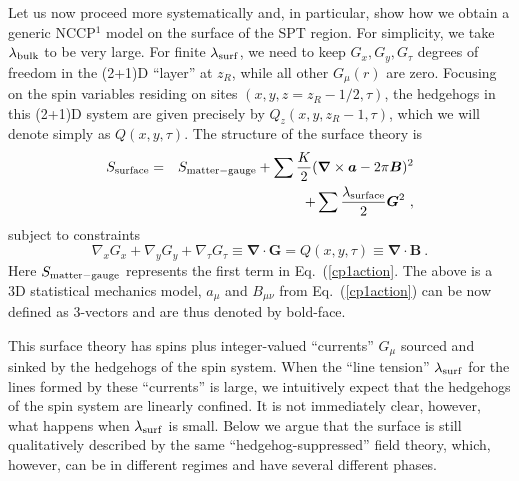\documentclass[prb,twocolumn]{revtex4-1}
\begin{document}
Let us now proceed more systematically and, in particular, show how we obtain a generic NCCP$^1$ model on the surface of the SPT region.  For simplicity, we take $\lambda_{\rm bulk}$ to be very large. For finite $\lambda_{\rm surf}$, we need to keep $G_x, G_y, G_\tau$ degrees of freedom in the (2+1)D ``layer'' at $z_R$, while all other $G_\mu(r)$ are zero.  Focusing on the spin variables residing on sites $(x, y, z=z_R-1/2, \tau)$, the hedgehogs in this (2+1)D system are given precisely by $Q_z(x, y, z_R-1, \tau)$, which we will denote simply as $Q(x, y, \tau)$.  The structure of the surface theory is
\begin{eqnarray*}
S_{\rm surface} &=& S_{\rm matter-gauge} + \sum \frac{K}{2} ({\bm\nabla} \times {\bm a} - 2\pi {\bm B})^2 \\
&& + \sum \frac{\lambda_{\rm surface}}{2} {\bm G}^2 ~,
\end{eqnarray*}
subject to constraints
\begin{equation}
 \nabla_x G_x + \nabla_y G_y + \nabla_\tau G_\tau \equiv {\bm \nabla} \cdot {\bm G} = Q(x,y,\tau) \equiv {\bm \nabla} \cdot {\bm B} ~.
\end{equation}
Here $S_{\rm matter-gauge}$ represents the first term in Eq.~(\ref{cp1action}. The above is a 3D statistical mechanics model, $a_\mu$ and $B_{\mu\nu}$ from Eq.~(\ref{cp1action}) can be now defined as 3-vectors and are thus denoted by bold-face. 

This surface theory has spins plus integer-valued ``currents'' $G_\mu$ sourced and sinked by the hedgehogs of the spin system.  When the ``line tension'' $\lambda_{\rm surf}$ for the lines formed by these ``currents'' is large, we intuitively expect that the hedgehogs of the spin system are linearly confined.  It is not immediately clear, however, what happens when $\lambda_{\rm surf}$ is small.  Below we argue that the surface is still qualitatively described by the same ``hedgehog-suppressed'' field theory, which, however, can be in different regimes and have several different phases.
\end{document}
